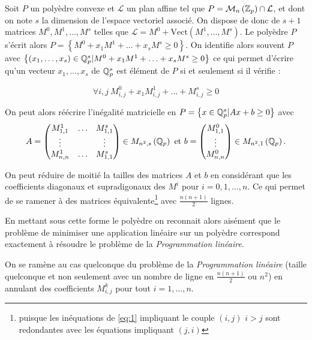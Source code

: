 \iffalse
Soit $P$ un polyèdre convexe et $\mathcal{L} $ un plan affine tel que $P = \mathcal{M}_n \left(  \mathbb {Z}_p  \right) \cap \mathcal{L}$, et dont on note $s$ la dimension de l'espace vectoriel associé. On dispose de donc de $s +1 $ matrices $M^0,M^1,\ldots, M^s$ telles que $\mathcal{L} = M^0 + \text{Vect}\left( M^1,\ldots,M^s \right)$. Le polyèdre $P$ s'écrit alors $P = \left\{ M^0 + x_1 M^1 + \ldots + x_s M^s \ge 0 \right\}$. On identifie alors souvent $P$ avec $\left\{ \left( x_1,\ldots,x_s \right) \in \mathbb{Q}_p^s |M^0 + x_1 M^1 + \ldots + x_s M^s \ge 0 \right\}$ ce qui permet d'écrire qu'un vecteur $x_1,\ldots,x_s$ de $\mathbb{Q}_p^s$ est élément de $P$ si et seulement si il vérifie :
 
	\begin{equation}
	\label{eq:1} 
\forall i,j ~  M^0_{i,j} + x_1 M^1_{i,j} + \ldots + M^s_{i,j} \ge 0
	\end{equation}

On peut alors réécrire l'inégalité matricielle en  $P = \left\{ x \in \mathbb{Q}_p^s \-| Ax + b \ge 0 \right\} $ avec 
\[A = \begin{pmatrix} M^1_{1,1} & \ldots & M^s_{1,1} \\
\vdots & & \vdots \\
M^1_{n,n} & \ldots & M^s_{1,1}\\ \end{pmatrix} \in M_{n^2,s}\left( \mathbb{Q}_p \right) \text{ et } 
b = \begin{pmatrix} M^0_{1,1} \\
\vdots\\
M^0_{n,n} \end{pmatrix} \in M_{n^2, 1}\left( \mathbb{Q}_p \right) 
.\]  
\begin{remarque}
	On peut réduire de moitié la tailles des matrices $A$ et $b$ en considérant que les coefficients diagonaux et supradigonaux des $M^i$ pour $i = 0,1,\ldots,n$. Ce qui permet de se ramener à des matrices équivalente\footnote{puisque les inéquations de \ref{eq:1} impliquant le couple $(i,j)$ $i>j$ sont redondantes avec les équations impliquant $(j,i)$}  avec $\frac{n(n+1)}{2}$ lignes.  
\end{remarque}

En mettant sous cette forme le polyèdre on reconnait alors aisément que le problème de minimiser une application linéaire sur un polyèdre correspond exactement à résoudre le problème de la \textit{Programmation linéaire}.

\begin{remarque}
	On se ramène au cas quelconque du problème de la \textit{Programmation linéaire} (taille quelconque et non seulement avec un nombre de ligne en $\frac{n(n+1)}{2}$ ou $n^2$) en annulant des coefficients $M^k_{i,j}$ pour tout $i=1,\ldots,n$.   
\end{remarque}

